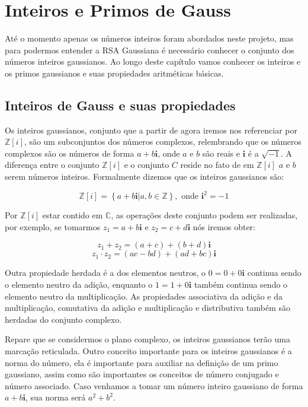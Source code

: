 \pagestyle{fancy}
\fancyhead[R]{\thepage}
\fancyfoot[C]{}



\chapter {Inteiros e Primos de Gauss}
\label{IG}
At\'e o momento apenas os n\'umeros inteiros foram abordados neste projeto, mas para podermos entender a RSA Gaussiana \'e necess\'ario conhecer o conjunto dos n\'umeros inteiros gaussianos. Ao longo deste cap\'itulo vamos conhecer os inteiros e os primos gaussianos e suas propiedades aritm\'eticas b\'asicas. 

\section{Inteiros de Gauss e suas propiedades}

Os inteiros gaussianos, conjunto que a partir de agora iremos nos referenciar por $\mathbb{Z}[i]$, s\~ao um subconjuntos dos n\'umeros complexos, relembrando que os n\'umeros complexos s\~ao os n\'umeros de forma $a+b\textbf{i}$, onde $a$ e $b$ s\~ao reais e $\textbf{i}$ \'e a $\sqrt{-1}$. A diferen\c{c}a entre o conjunto $\mathbb{Z}[i]$ e o conjunto $C$ reside no fato de em $\mathbb{Z}[i]$ $a$ e $b$ serem n\'umeros inteiros. Formalmente dizemos que os inteiros gaussianos s\~ao:

$$\mathbb{Z}[i]= \left\{a+b\textbf{i} | a,b \in \mathbb{Z}  \right\}, \textrm{ onde } \textbf{i}^2 = -1$$

Por $\mathbb{Z}[i]$ estar contido em $\mathbb{C}$, as opera\c{c}\~oes deste conjunto podem ser realizadas, por exemplo, se tomarmos $z_1= a + b\textbf{i}$ e $z_2= c + d\textbf{i}$ n\'os iremos obter:

$$z_1   +   z_2 = (a + c) + (b + d)\textbf{i}$$
$$z_1 \cdot z_2 = (ac - bd) + (ad + bc)\textbf{i}$$

Outra propiedade herdada \'e a dos elementos neutros, o $0 = 0 + 0\textbf{i}$ continua sendo o elemento neutro da adi\c{c}\~ao, enquanto o $1 = 1 + 0\textbf{i}$ tamb\'em continua sendo o elemento neutro da multiplica\c{c}\~ao. As propiedades associativa da adi\c{c}\~ao e da multiplica\c{c}\~ao, comutativa da adi\c{c}\~ao e multiplica\c{c}\~ao e distributiva tamb\'em s\~ao herdadas do conjunto complexo.

Repare que se considermos o plano complexo, os inteiros gaussianos ter\~ao uma marca\c{c}\~ao reticulada. Outro conceito importante para os inteiros gaussianos \'e a norma do n\'umero, ela \'e importante para auxiliar na defini\c{c}\~ao de um primo gaussiano, assim como s\~ao importantes os conceitos de n\'umero conjugado e n\'umero associado. Caso venhamos a tomar um n\'umero inteiro gaussiano de forma $a+b\textbf{i}$, sua norma ser\'a $a^2 +b^2$.


